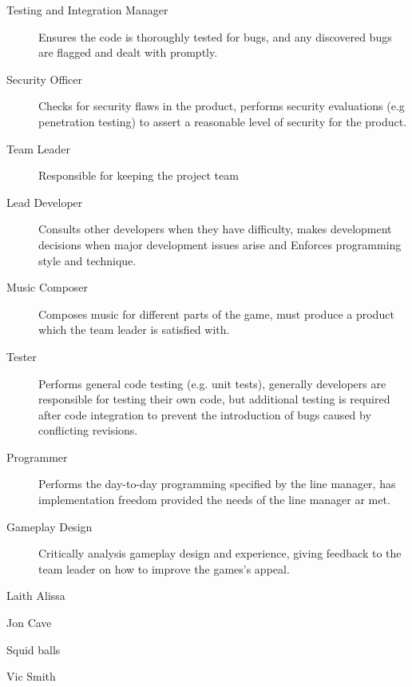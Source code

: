 \begin{description}
    \item[Testing and Integration Manager] Ensures the code is thoroughly tested for bugs, and any discovered bugs are flagged and dealt with promptly. 
     
    \item[Security Officer] Checks for security flaws in the product, performs security evaluations (e.g penetration testing) to assert a reasonable level of security for the product.
     
    \item[Team Leader] Responsible for keeping the project team
      
    \item[Lead Developer] Consults other developers when they have difficulty, makes development decisions when major development issues arise and Enforces programming style and technique.
     
    \item[Music Composer] Composes music for different parts of the game, must produce a product which the team leader is satisfied with.
    \item[Tester] Performs general code testing (e.g. unit tests), generally developers are responsible for testing their own code, but additional testing is required after code integration to prevent the introduction of bugs caused by conflicting revisions.
    \item[Programmer] Performs the day-to-day programming specified by the line manager, has implementation freedom provided the needs of the line manager ar met.
    \item[Gameplay Design] Critically analysis gameplay design and experience, giving feedback to the team leader on how to improve the games's appeal.
\end{description}

\begin{description}
    \item{Laith Alissa}
    \item{Jon Cave}
    \item{Squid balls}
    \item{Vic Smith}
\end{description}